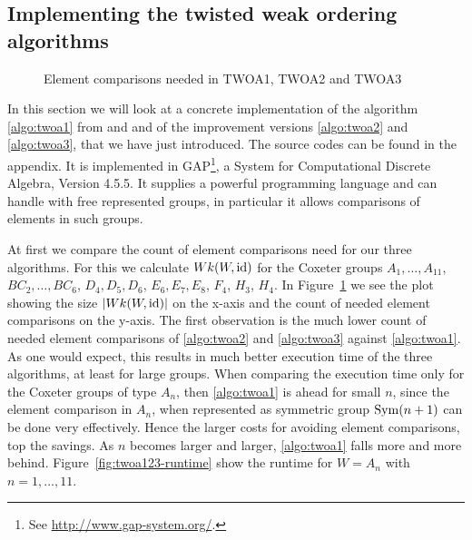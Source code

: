 \subsection{Implementing the twisted weak ordering algorithms}
\label{sec:implementing-twisted-involutions-algorithms}

\begin{figure}[ht]
	\centering
	\caption{Element comparisons needed in TWOA1, TWOA2 and TWOA3}
	\label{fig:twoa123-element-comparisons}
\end{figure}

In this section we will look at a concrete implementation of the algorithm \ref{algo:twoa1} from \cite{brennemann:twoa} and \cite{haas:twoa} and of the improvement versions \ref{algo:twoa2} and \ref{algo:twoa3}, that we have just introduced. The source codes can be found in the appendix. It is implemented in GAP\footnote{See \url{http://www.gap-system.org/}.}, a System for Computational Discrete Algebra, Version 4.5.5. It supplies a powerful programming language and can handle with free represented groups, in particular it allows comparisons of elements in such groups. 

At first we compare the count of element comparisons need for our three algorithms. For this we calculate $Wk(W,\operatorname{id})$ for the Coxeter groups $A_1,\ldots,A_{11}$, $BC_2,\ldots,BC_6$, $D_4,D_5,D_6$, $E_6,E_7,E_8$, $F_4$, $H_3$, $H_4$. In Figure~\ref{fig:twoa123-element-comparisons} we see the plot showing the size $|Wk(W,\operatorname{id})|$ on the x-axis and the count of needed element comparisons on the y-axis. The first observation is the much lower count of needed element comparisons of \ref{algo:twoa2} and \ref{algo:twoa3} against \ref{algo:twoa1}. As one would expect, this results in much better execution time of the three algorithms, at least for large groups. When comparing the execution time only for the Coxeter groups of type $A_n$, then \ref{algo:twoa1} is ahead for small $n$, since the element comparison in $A_n$, when represented as symmetric group $\operatorname{Sym}(n+1)$ can be done very effectively. Hence the larger costs for avoiding element comparisons, top the savings. As $n$ becomes larger and larger, \ref{algo:twoa1} falls more and more behind. Figure~\ref{fig:twoa123-runtime} show the runtime for $W=A_n$ with $n=1,\dots,11$.

